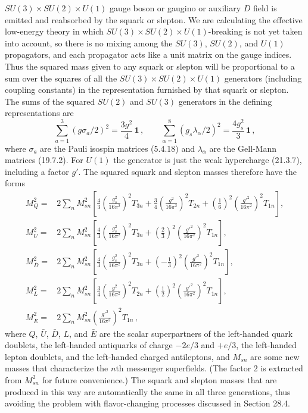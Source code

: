 \(SU(3)\times SU(2)\times U(1)\) gauge boson or gaugino
or auxiliary \(D\) field is emitted and reabsorbed by the squark or
slepton. We are calculating the effective low-energy theory in which
\(SU(3)\times SU(2)\times U(1)\)-breaking is not yet taken
into account, so there is no mixing among the \(SU(3)\), \(SU(2)\), and
\(U(1)\) propagators, and each propagator acts like a unit matrix on the
gauge indices. Thus the squared mass given to any squark or slepton will be
proportional to a sum over the squares of all the
\(SU(3)\times SU(2)\times U(1)\) generators (including
coupling constants) in the representation furnished by that squark or
slepton. The sums of the squared \(SU(2)\) and \(SU(3)\) generators in the
defining representations are
\[
  \sum_{a=1}^{3}(g\sigma_a/2)^2
  =\frac{3g^2}{4}\,\mathbf{1}\,,
  \qquad
  \sum_{\alpha=1}^{8}(g_s\lambda_\alpha/2)^2
  =\frac{4g_s^2}{3}\,\mathbf{1}\,,
\]
where \(\sigma_a\) are the Pauli isospin matrices (5.4.18) and
\(\lambda_\alpha\) are the Gell-Mann matrices (19.7.2). For \(U(1)\) the
generator is just the weak hypercharge (21.3.7), including a factor \(g'\).
The squared squark and slepton masses therefore have the forms
\begin{equation}
  \begin{aligned}
    M_Q^2={}&2\sum_n M_{sn}^2
      \left[
        \frac{4}{3}\left(\frac{g_s^2}{16\pi^2}\right)^2T_{3n}
        +\frac{3}{4}\left(\frac{g^2}{16\pi^2}\right)^2T_{2n}
        +\left(\frac{1}{6}\right)^2
          \left(\frac{g'^2}{16\pi^2}\right)^2T_{1n}
      \right],\\
    M_{\bar U}^2={}&2\sum_n M_{sn}^2
      \left[
        \frac{4}{3}\left(\frac{g_s^2}{16\pi^2}\right)^2T_{3n}
        +\left(\frac{2}{3}\right)^2
          \left(\frac{g'^2}{16\pi^2}\right)^2T_{1n}
      \right],\\
    M_{\bar D}^2={}&2\sum_n M_{sn}^2
      \left[
        \frac{4}{3}\left(\frac{g_s^2}{16\pi^2}\right)^2T_{3n}
        +\left(-\frac{1}{3}\right)^2
          \left(\frac{g'^2}{16\pi^2}\right)^2T_{1n}
      \right],\\
    M_L^2={}&2\sum_n M_{sn}^2
      \left[
        \frac{3}{4}\left(\frac{g^2}{16\pi^2}\right)^2T_{2n}
        +\left(\frac{1}{2}\right)^2
          \left(\frac{g'^2}{16\pi^2}\right)^2T_{1n}
      \right],\\
    M_{\bar E}^2={}&2\sum_n M_{sn}^2
      \left(\frac{g'^2}{16\pi^2}\right)^2T_{1n}\,,
  \end{aligned}
  \tag{28.6.4}\label{eq:28.6.4}
\end{equation}
where \(Q\), \(\bar U\), \(\bar D\), \(L\), and \(\bar E\) are the scalar
superpartners of the left-handed quark doublets, the left-handed
antiquarks of charge \(-2e/3\) and \(+e/3\), the left-handed lepton
doublets, and the left-handed charged antileptons, and \(M_{sn}\) are some
new masses that characterize the \(n\)th messenger superfields. (The
factor 2 is extracted from \(M_{sn}^2\) for future convenience.) The
squark and slepton masses that are produced in this way are automatically
the same in all three generations, thus avoiding the problem with
flavor-changing processes discussed in Section 28.4.

